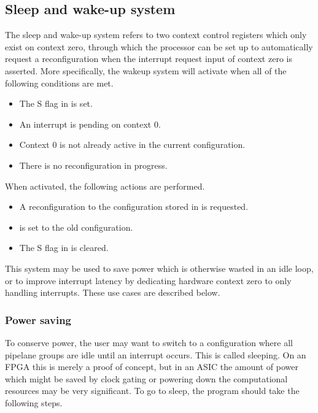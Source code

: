 \subsection{Sleep and wake-up system}
\label{sec:core-ug-reconf-saw}

The sleep and wake-up system refers to two context control registers which only 
exist on context zero, through which the processor can be set up to 
automatically request a reconfiguration when the interrupt request input of 
context zero is asserted. More specifically, the wakeup system will activate
when all of the following conditions are met.

\begin{itemize}
\item The S flag in  is set.
\item An interrupt is pending on context 0.
\item Context 0 is not already active in the current configuration.
\item There is no reconfiguration in progress.
\end{itemize}

\noindent When activated, the following actions are performed.

\begin{itemize}
\item A reconfiguration to the configuration stored in  is requested.
\item {} is set to the old configuration.
\item The S flag in  is cleared.
\end{itemize}

\noindent This system may be used to save power which is otherwise wasted in an 
idle loop, or to improve interrupt latency by dedicating hardware context zero 
to only handling interrupts. These use cases are described below.

\subsubsection{Power saving}
\label{sec:core-ug-reconf-saw-power}

To conserve power, the user may want to switch to a configuration where all 
pipelane groups are idle until an interrupt occurs. This is called sleeping. On 
an FPGA this is merely a proof of concept, but in an ASIC the amount of power 
which might be saved by clock gating or powering down the computational 
resources may be very significant. To go to sleep, the program should take the 
following steps.

